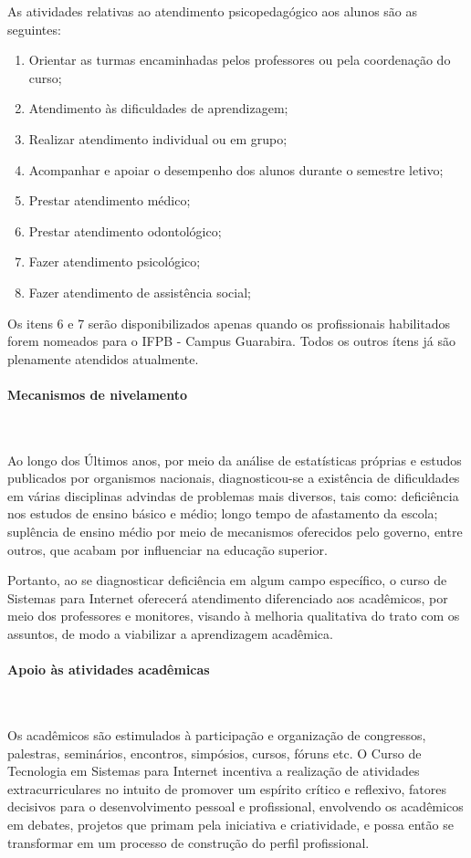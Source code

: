        As atividades relativas ao atendimento psicopedagógico aos alunos são as seguintes:

\begin{enumerate}
\item Orientar as turmas encaminhadas pelos professores ou pela coordenação do curso; 
\item Atendimento às dificuldades de aprendizagem;
\item Realizar atendimento individual ou em grupo;
\item Acompanhar e apoiar o desempenho dos alunos durante o semestre letivo;
\item Prestar atendimento médico;
\item Prestar atendimento odontológico;
\item Fazer atendimento psicológico;
\item Fazer atendimento de assistência social;
\end{enumerate}

	Os itens 6 e 7 ser\~ao disponibilizados apenas quando os profissionais habilitados forem nomeados para o IFPB - Campus Guarabira. Todos os outros \'itens j\'a s\~ao plenamente atendidos atualmente.

\paragraph{Mecanismos de nivelamento}\

Ao longo dos Últimos anos, por meio da análise de estatísticas próprias e estudos publicados por organismos nacionais, diagnosticou-se a existência de dificuldades em várias disciplinas advindas de problemas mais diversos, tais como: deficiência nos estudos de ensino básico e médio; longo tempo de afastamento da escola; suplência de ensino médio por meio de mecanismos oferecidos pelo governo, entre outros, que acabam por influenciar na educação superior.

Portanto, ao se diagnosticar deficiência em algum campo específico, o curso de Sistemas para Internet oferecer\'a atendimento diferenciado aos acadêmicos, por meio dos professores e monitores, visando à melhoria qualitativa do trato com os assuntos, de modo a viabilizar a aprendizagem acadêmica.

\paragraph{Apoio \`as atividades acad\^emicas}\

Os acadêmicos são estimulados \`a participação e organização de congressos, palestras, seminários, encontros, simpósios, cursos, fóruns etc. O Curso de Tecnologia em Sistemas para Internet incentiva a realização de atividades extracurriculares no intuito de promover um espírito crítico e reflexivo, fatores decisivos para o desenvolvimento pessoal e profissional, envolvendo os acadêmicos em debates, projetos que primam pela iniciativa e criatividade, e possa então se transformar em um processo de construção do perfil profissional.

